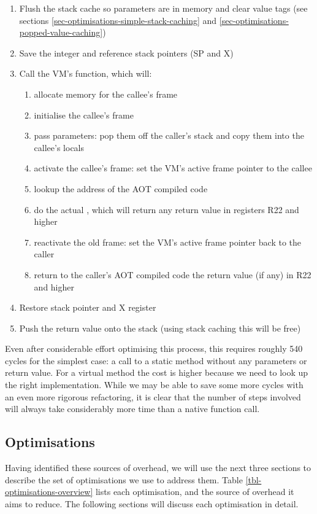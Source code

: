 \begin{enumerate}
  \small
  \item Flush the stack cache so parameters are in memory and clear value tags (see sections \ref{sec-optimisations-simple-stack-caching} and \ref{sec-optimisations-popped-value-caching})
  \item Save the integer and reference stack pointers (SP and X)
  \item Call the VM's  function, which will:
  \begin{enumerate}
    \item allocate memory for the callee's frame
    \item initialise the callee's frame
    \item pass parameters: pop them off the caller's stack and copy them into the callee's locals
    \item activate the callee's frame: set the VM's active frame pointer to the callee
    \item lookup the address of the AOT compiled code
    \item do the actual , which will return any return value in registers R22 and higher
    \item reactivate the old frame: set the VM's active frame pointer back to the caller
    \item return to the caller's AOT compiled code the return value (if any) in R22 and higher
  \end{enumerate}
  \item Restore stack pointer and X register
  \item Push the return value onto the stack (using stack caching this will be free)
\end{enumerate}

Even after considerable effort optimising this process, this requires roughly 540 cycles for the simplest case: a call to a static method without any parameters or return value. For a virtual method the cost is higher because we need to look up the right implementation. While we may be able to save some more cycles with an even more rigorous refactoring, it is clear that the number of steps involved will always take considerably more time than a native function call.

\subsection{Optimisations}
\label{sec-optimisations-java-source}
Having identified these sources of overhead, we will use the next three sections to describe the set of optimisations we use to address them. Table \ref{tbl-optimisations-overview} lists each optimisation, and the source of overhead it aims to reduce. The following sections will discuss each optimisation in detail.


